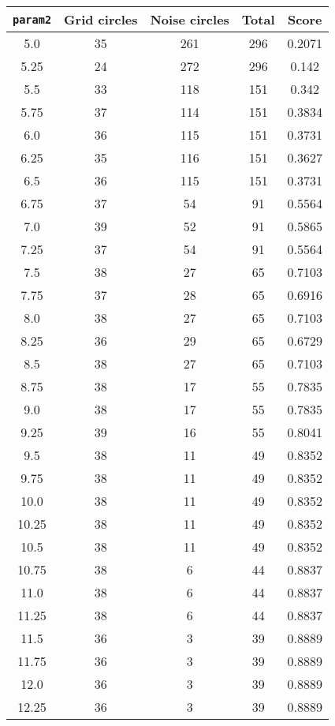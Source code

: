 \documentclass[letterpaper, 12pt]{article}
\begin{document}
\begin{longtable}{|c|c|c|c|c|}
\hline
\textbf{\texttt{param2}} & \textbf{Grid circles} & \textbf{Noise circles} & \textbf{Total} & \textbf{Score} \\
\hline
5.0 & 35 & 261 & 296 & 0.2071 \\
\hline
5.25 & 24 & 272 & 296 & 0.142 \\
\hline
5.5 & 33 & 118 & 151 & 0.342 \\
\hline
5.75 & 37 & 114 & 151 & 0.3834 \\
\hline
6.0 & 36 & 115 & 151 & 0.3731 \\
\hline
6.25 & 35 & 116 & 151 & 0.3627 \\
\hline
6.5 & 36 & 115 & 151 & 0.3731 \\
\hline
6.75 & 37 & 54 & 91 & 0.5564 \\
\hline
7.0 & 39 & 52 & 91 & 0.5865 \\
\hline
7.25 & 37 & 54 & 91 & 0.5564 \\
\hline
7.5 & 38 & 27 & 65 & 0.7103 \\
\hline
7.75 & 37 & 28 & 65 & 0.6916 \\
\hline
8.0 & 38 & 27 & 65 & 0.7103 \\
\hline
8.25 & 36 & 29 & 65 & 0.6729 \\
\hline
8.5 & 38 & 27 & 65 & 0.7103 \\
\hline
8.75 & 38 & 17 & 55 & 0.7835 \\
\hline
9.0 & 38 & 17 & 55 & 0.7835 \\
\hline
9.25 & 39 & 16 & 55 & 0.8041 \\
\hline
9.5 & 38 & 11 & 49 & 0.8352 \\
\hline
9.75 & 38 & 11 & 49 & 0.8352 \\
\hline
10.0 & 38 & 11 & 49 & 0.8352 \\
\hline
10.25 & 38 & 11 & 49 & 0.8352 \\
\hline
10.5 & 38 & 11 & 49 & 0.8352 \\
\hline
10.75 & 38 & 6 & 44 & 0.8837 \\
\hline
11.0 & 38 & 6 & 44 & 0.8837 \\
\hline
11.25 & 38 & 6 & 44 & 0.8837 \\
\hline
11.5 & 36 & 3 & 39 & 0.8889 \\
\hline
11.75 & 36 & 3 & 39 & 0.8889 \\
\hline
12.0 & 36 & 3 & 39 & 0.8889 \\
\hline
12.25 & 36 & 3 & 39 & 0.8889 \\
\hline

\end{longtable}
\end{document}
